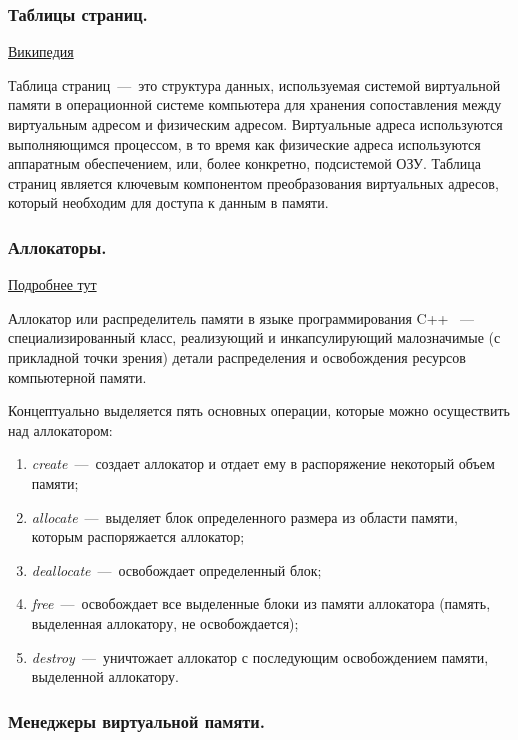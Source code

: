 \documentclass{article}
\begin{document}
\subsubsection{Таблицы страниц.}

\href{https://ru.wikipedia.org/wiki/%D0%A2%D0%B0%D0%B1%D0%BB%D0%B8%D1%86%D0%B0_%D1%81%D1%82%D1%80%D0%B0%D0%BD%D0%B8%D1%86}{Википедия}

Таблица страниц~---~это структура данных, используемая системой виртуальной памяти в операционной системе компьютера для хранения сопоставления между виртуальным адресом и физическим адресом. Виртуальные адреса используются выполняющимся процессом, в то время как физические адреса используются аппаратным обеспечением, или, более конкретно, подсистемой ОЗУ. Таблица страниц является ключевым компонентом преобразования виртуальных адресов, который необходим для доступа к данным в памяти.

\subsubsection{Аллокаторы.}

\href{https://habr.com/ru/post/505632/}{Подробнее тут}

Аллокатор или распределитель памяти в языке программирования C++ ~---~ специализированный класс, реализующий и инкапсулирующий малозначимые (с прикладной точки зрения) детали распределения и освобождения ресурсов компьютерной памяти.

Концептуально выделяется пять основных операции, которые можно осуществить над аллокатором:
\begin{enumerate}
	\item \emph{create}~---~создает аллокатор и отдает ему в распоряжение некоторый объем памяти;
	\item \emph{allocate}~---~выделяет блок определенного размера из области памяти, которым распоряжается аллокатор;
	\item \emph{deallocate}~---~освобождает определенный блок;
	\item \emph{free}~---~освобождает все выделенные блоки из памяти аллокатора (память, выделенная аллокатору, не освобождается);
	\item \emph{destroy}~---~уничтожает аллокатор с последующим освобождением памяти, выделенной аллокатору.
\end{enumerate}

\subsubsection{Менеджеры виртуальной памяти.}
\end{document}
